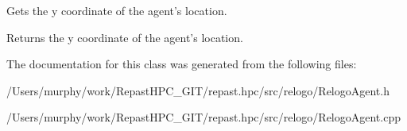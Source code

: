 Gets the y coordinate of the agent's location. 

\begin{DoxyReturn}{Returns}
the y coordinate of the agent's location. 
\end{DoxyReturn}


The documentation for this class was generated from the following files\-:\begin{DoxyCompactItemize}
\item 
/\-Users/murphy/work/\-Repast\-H\-P\-C\-\_\-\-G\-I\-T/repast.\-hpc/src/relogo/Relogo\-Agent.\-h\item 
/\-Users/murphy/work/\-Repast\-H\-P\-C\-\_\-\-G\-I\-T/repast.\-hpc/src/relogo/Relogo\-Agent.\-cpp\end{DoxyCompactItemize}
